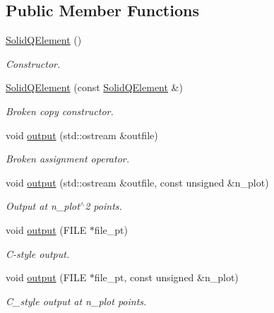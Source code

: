 \subsection*{Public Member Functions}
\begin{DoxyCompactItemize}
\item 
\hyperlink{classoomph_1_1SolidQElement_3_012_00_01NNODE__1D_01_4_af7284d96e93832ca0dc1b17799c576c1}{Solid\+Q\+Element} ()
\begin{DoxyCompactList}\small\item\em Constructor. \end{DoxyCompactList}\item 
\hyperlink{classoomph_1_1SolidQElement_3_012_00_01NNODE__1D_01_4_af2633daba0fe1bd2f69fb2ac15996c9a}{Solid\+Q\+Element} (const \hyperlink{classoomph_1_1SolidQElement}{Solid\+Q\+Element} \&)
\begin{DoxyCompactList}\small\item\em Broken copy constructor. \end{DoxyCompactList}\item 
void \hyperlink{classoomph_1_1SolidQElement_3_012_00_01NNODE__1D_01_4_a849d3059d7f4e6080bc889f1acb381dd}{output} (std\+::ostream \&outfile)
\begin{DoxyCompactList}\small\item\em Broken assignment operator. \end{DoxyCompactList}\item 
void \hyperlink{classoomph_1_1SolidQElement_3_012_00_01NNODE__1D_01_4_abf15749cc9224e1412d3f404e20b69e4}{output} (std\+::ostream \&outfile, const unsigned \&n\+\_\+plot)
\begin{DoxyCompactList}\small\item\em Output at n\+\_\+plot$^\wedge$2 points. \end{DoxyCompactList}\item 
void \hyperlink{classoomph_1_1SolidQElement_3_012_00_01NNODE__1D_01_4_a14c6010937dc14338a3b8eb4f5ab8bb6}{output} (F\+I\+LE $\ast$file\+\_\+pt)
\begin{DoxyCompactList}\small\item\em C-\/style output. \end{DoxyCompactList}\item 
void \hyperlink{classoomph_1_1SolidQElement_3_012_00_01NNODE__1D_01_4_a600c5d98f117ac64a07b95a75d06cf03}{output} (F\+I\+LE $\ast$file\+\_\+pt, const unsigned \&n\+\_\+plot)
\begin{DoxyCompactList}\small\item\em C\+\_\+style output at n\+\_\+plot points. \end{DoxyCompactList}\item 

\end{DoxyCompactItemize}
